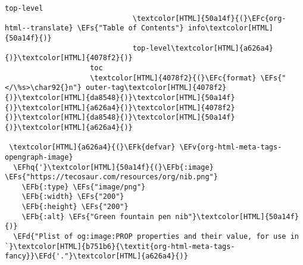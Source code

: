 \documentclass{scrartcl}
\newcommand{\EFk}[1]{\textcolor{EFk}{#1}} %
\newcommand{\EFd}[1]{\textcolor{EFd}{\textit{#1}}} %
\newcommand{\EFs}[1]{\textcolor{EFs}{#1}} %
\newcommand{\EFb}[1]{\textcolor{EFb}{#1}} %
\newcommand{\EFc}[1]{\textcolor{EFc}{#1}} %
\newcommand{\EFv}[1]{\textcolor{EFv}{#1}} %
\newcommand{\EFhq}[1]{\textcolor{EFhq}{#1}} %
\begin{document}
\begin{Code}
\begin{Verbatim}[]
                              top-level
                              \textcolor[HTML]{50a14f}{(}\EFc{org-html--translate} \EFs{"Table of Contents"} info\textcolor[HTML]{50a14f}{)}
                              top-level\textcolor[HTML]{a626a4}{)}\textcolor[HTML]{4078f2}{)}
                    toc
                    \textcolor[HTML]{4078f2}{(}\EFc{format} \EFs{"</\%s>\char92{}n"} outer-tag\textcolor[HTML]{4078f2}{)}\textcolor[HTML]{da8548}{)}\textcolor[HTML]{50a14f}{)}\textcolor[HTML]{a626a4}{)}\textcolor[HTML]{4078f2}{)}\textcolor[HTML]{da8548}{)}\textcolor[HTML]{50a14f}{)}\textcolor[HTML]{a626a4}{)}

 \textcolor[HTML]{a626a4}{(}\EFk{defvar} \EFv{org-html-meta-tags-opengraph-image}
  \EFhq{'}\textcolor[HTML]{50a14f}{(}\EFb{:image} \EFs{"https://tecosaur.com/resources/org/nib.png"}
    \EFb{:type} \EFs{"image/png"}
    \EFb{:width} \EFs{"200"}
    \EFb{:height} \EFs{"200"}
    \EFb{:alt} \EFs{"Green fountain pen nib"}\textcolor[HTML]{50a14f}{)}
  \EFd{"Plist of og:image:PROP properties and their value, for use in `}\textcolor[HTML]{b751b6}{\textit{org-html-meta-tags-fancy}}\EFd{'."}\textcolor[HTML]{a626a4}{)}


\end{Verbatim}
\end{Code}
\end{document}
